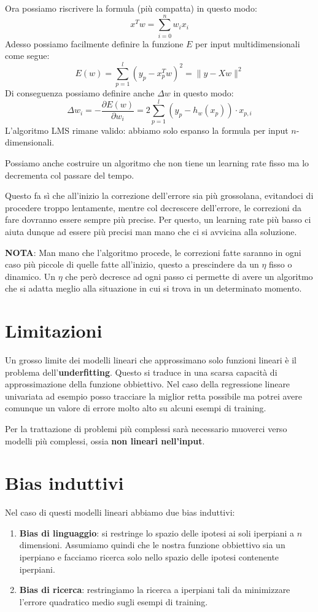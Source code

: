 Ora possiamo riscrivere la formula (pi\`u compatta) in questo modo:
\[ x^T w = \sum_{i=0}^n w_i x_i \]
Adesso possiamo facilmente definire la funzione $E$ per input multidimensionali come segue:
\[ E(w) = \sum_{p=1}^l (y_p - x^T_p w)^2 = \| y - X w \|^2 \]
Di conseguenza possiamo definire anche $\Delta w$ in questo modo:
\[ \Delta w_i = -\frac{\partial E(w)}{\partial w_i} = 2 \sum_{p=1}^l (y_p - h_w(x_p)) \cdot x_{p, i} \]
L'algoritmo LMS rimane valido: abbiamo solo espanso la formula per input $n$-dimensionali.

Possiamo anche costruire un algoritmo che non tiene un learning rate fisso ma lo decrementa col passare del tempo.

Questo fa s\`i che all'inizio la correzione dell'errore sia pi\`u grossolana, evitandoci di procedere troppo lentamente,
mentre col decrescere dell'errore, le correzioni da fare dovranno essere sempre pi\`u precise. Per questo, un learning
rate pi\`u basso ci aiuta dunque ad essere pi\`u precisi man mano che ci si avvicina alla soluzione.

\textbf{NOTA}: Man mano che l'algoritmo procede, le correzioni fatte saranno in ogni caso pi\`u piccole di quelle fatte
all'inizio, questo a prescindere da un $\eta$ fisso o dinamico. Un $\eta$ che per\`o decresce ad ogni passo ci permette di
avere un algoritmo che si adatta meglio alla situazione in cui si trova in un determinato momento.

\section{Limitazioni}
Un grosso limite dei modelli lineari che approssimano solo funzioni lineari \`e il problema dell'\textbf{underfitting}.
Questo si traduce in una scarsa capacit\`a di approssimazione della funzione obbiettivo. Nel caso della regressione
lineare univariata ad esempio posso tracciare la miglior retta possibile ma potrei avere comunque un valore di errore
molto alto su alcuni esempi di training.

Per la trattazione di problemi pi\`u complessi sar\`a necessario muoverci verso modelli pi\`u complessi, ossia
\textbf{non lineari nell'input}.

\section{Bias induttivi}
Nel caso di questi modelli lineari abbiamo due bias induttivi:
\begin{enumerate}
	\item \textbf{Bias di linguaggio}: si restringe lo spazio delle ipotesi ai soli iperpiani a
	      $n$ dimensioni. Assumiamo quindi che le nostra funzione obbiettivo sia un iperpiano e
	      facciamo ricerca solo nello spazio delle ipotesi contenente iperpiani.
	\item \textbf{Bias di ricerca}: restringiamo la ricerca a iperpiani tali da minimizzare l'errore quadratico
	      medio sugli esempi di training.
\end{enumerate}